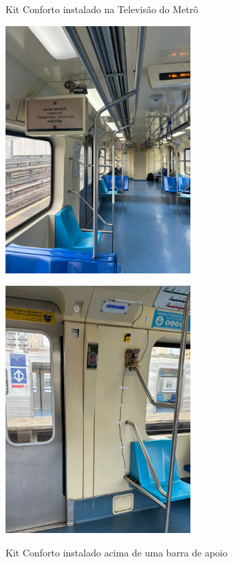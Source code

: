 \documentclass[acronym,symbols,table]{fei}
\begin{document}
\begin{figure}[!htb] 
    \centering
    \begin{minipage}{0.45\textwidth}
        \caption{Kit Conforto instalado na Televisão do Metrô}
        \includegraphics[width=\linewidth, height=9.5cm]{Imagens/kittv.jpeg} 
        \label{fig:kittv}
    \end{minipage}\hfill
    \begin{minipage}{0.45\textwidth}
        \caption{Kit Conforto instalado acima de uma barra de apoio}
        \includegraphics[width=\linewidth, height=9.5cm]{Imagens/kitporta.jpeg} 
        \label{fig:kitporta}
    \end{minipage}
\end{figure}
\end{document}
